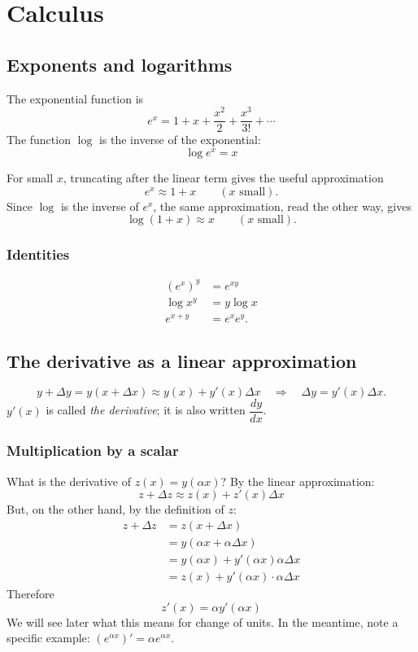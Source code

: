 \chapter{Calculus}

\section{Exponents and logarithms}
The exponential function is
\[
e^x = 1 + x + \frac{x^2}{2} + \frac{x^3}{3!} + \cdots
\]
The function $\log$ is the inverse of the exponential:
\[
\log e^x = x
\]


For small $x$, truncating after the linear term gives the useful approximation
\[
e^x \approx 1+x \qquad (x \text{ small}).
\]
Since $\log$ is the inverse of $e^x$, the same approximation, read the other way, gives
\[
\log(1+x) \approx x \qquad (x \text{ small}).
\]

\subsection{Identities}
\begin{align*}
  \left (e^x\right )^y &= e^{xy} \\
  \log x^y &= y \log x \\
  e^{x+y} &= e^x e^y.
\end{align*}

\section{The derivative as a linear approximation}
\[
y+\Delta y = y(x+\Delta x) \approx y(x) + y'(x)\Delta x
\quad\Longrightarrow\quad
\Delta y = y'(x)\Delta x.
\]
$y'(x)$ is called \emph{the derivative}; it is also written $\dfrac{dy}{dx}$.

\subsection{Multiplication by a scalar}
What is the derivative of $z(x) = y(\alpha x)$? By the linear approximation:
\[
z + \Delta z \approx z(x) + z'(x) \Delta x
\]
But, on the other hand, by the definition of $z$:
\begin{align*}
  z + \Delta z &= z(x+\Delta x)\\
  &= y(\alpha x + \alpha \Delta x) \\
  &=y(\alpha x) + y'(\alpha x) \alpha \Delta x \\
  &=z(x) + y'(\alpha x) \cdot  \alpha \Delta x
\end{align*}
Therefore
\[
z'(x) = \alpha y'(\alpha x)  
\]
We will see later what this means for change of units. In the
meantime, note a specific example: $(e^{\alpha x})' = \alpha e^{\alpha x}$.
